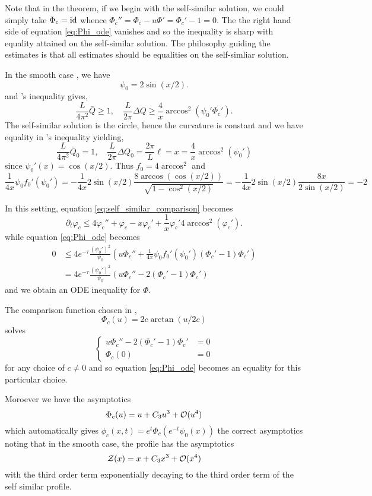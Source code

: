 \documentclass[a4paper, 12pt]{amsart}
\begin{document}
\begin{rem}
 Note that in the theorem, if we begin with the self-similar solution, we could simply take $\Phi_c = \operatorname{id}$ whence $\Phi_c'' = \Phi_c - u \Phi' = \Phi_c' - 1 = 0$. The the right hand side of equation \eqref{eq:Phi_ode} vanishes and so the inequality is sharp with equality attained on the self-similar solution. The philosophy guiding the estimates is that all estimates should be equalities on the self-simliar solution.
\end{rem}

\begin{rem}
\label{rem:smooth_case}
In the smooth case \cite{MR2794630}, we have
\[
\psi_0 = 2 \sin(x/2).
\]
and \holder's inequality gives,
\[
\frac{L}{4\pi^2} \bar{Q} \geq 1, \quad \frac{L}{2\pi} \Delta Q \geq \frac{4}{x} \arccos^2(\psi_0'\Phi_c').
\]
The self-similar solution is the circle, hence the curvature is constant and we have equality in \holder{}'s inequality yielding,
\[
\frac{L}{4\pi^2} \bar{Q}_0 = 1, \quad \frac{L}{2\pi} \Delta Q_0 = \frac{2\pi}{L} \ell = x = \frac{4}{x} \arccos^2(\psi_0')
\]
since $\psi_0'(x) = \cos(x/2)$. Thus $f_0 = 4 \arccos^2$ and
\[
\frac{1}{4x} \psi_0 f_0'(\psi_0') = - \frac{1}{4x} 2 \sin(x/2) \frac{8\arccos(\cos(x/2))}{\sqrt{1 - \cos^2(x/2)}} = - \frac{1}{4x} 2 \sin(x/2) \frac{8x}{2\sin(x/2)} = -2
\]

In this setting, equation \eqref{eq:self_similar_comparison} becomes
\[
\partial_t \varphi_c \leq 4 \varphi_c'' + \varphi_c - x\varphi_c' + \frac{1}{x} \varphi_c' 4\arccos^2(\varphi_c').
\]
while equation \eqref{eq:Phi_ode} becomes
\[
\begin{split}
0 &\leq 4 e^{-\tau} \frac{(\psi_0')^2}{\psi_0} \left(u \Phi_c'' + \frac{1}{4x} \psi_0 f_0'(\psi_0')(\Phi_c' - 1) \Phi_c'\right) \\
&= 4 e^{-\tau} \frac{(\psi_0')^2}{\psi_0} \left(u \Phi_c'' - 2 (\Phi_c' - 1) \Phi_c'\right)
\end{split}
\]
and we obtain an ODE inequality for $\Phi$.

The comparison function chosen in \cite{MR2794630},
\[
\Phi_c (u) = 2 c \arctan(u/2c)
\]
solves
\[
\begin{cases}
u \Phi_c'' - 2 (\Phi_c' - 1) \Phi_c' &= 0 \\
\Phi_c(0) &= 0
\end{cases}
\]
for any choice of $c \ne 0$ and so equation \eqref{eq:Phi_ode} becomes an equality for this particular choice.

Moroever we have the asymptotics
\[
\Phi_c(u) = u + C_3 u^3 + \operatorname{\mathcal{O}}(u^4)
\]
which automatically gives $\phi_c(x, t) = e^t \Phi_c (e^{-t} \psi_0(x))$ the correct asymptotics noting that in the smooth case, the profile has the asymptotics
\[
\operatorname{\mathcal{Z}}(x) = x + C_3 x^3 + \operatorname{\mathcal{O}}(x^4)
\]
with the third order term exponentially decaying to the third order term of the self similar profile.
\end{rem}



\printbibliography
\end{document}
